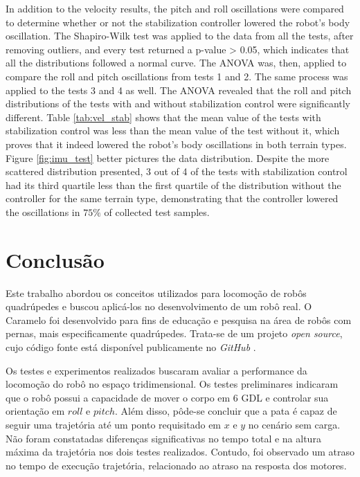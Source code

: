 \documentclass[conference]{IEEEtran}
\begin{document}
In addition to the velocity results, the pitch and roll oscillations were compared to determine whether or not the stabilization controller lowered the robot's body oscillation. The Shapiro-Wilk test was applied to the data from all the tests, after removing outliers, and every test returned a p-value > 0.05, which indicates that all the distributions followed a normal curve. The ANOVA was, then, applied to compare the roll and pitch oscillations from tests 1 and 2. The same process was applied to the tests 3 and 4 as well. The ANOVA revealed that the roll and pitch distributions of the tests with and without stabilization control were significantly different. Table \ref{tab:vel_stab} shows that the mean value of the tests with stabilization control was less than the mean value of the test without it, which proves that it indeed lowered the robot's body oscillations in both terrain types. Figure \ref{fig:imu_test} better pictures the data distribution. Despite the more scattered distribution presented, 3 out of 4 of the tests with stabilization control had its third quartile less than the first quartile of the distribution without the controller for the same terrain type, demonstrating that the controller lowered the oscillations in $75\%$ of collected test samples.


\section{Conclusão}

Este trabalho abordou os conceitos utilizados para locomoção de robôs quadrúpedes e buscou aplicá-los no desenvolvimento de um robô real. O Caramelo foi desenvolvido para fins de educação e pesquisa na área de robôs com pernas, mais especificamente quadrúpedes. Trata-se de um projeto \textit{open source}, cujo código fonte está disponível publicamente no \textit{GitHub} \cite{CaramelRepo}.

Os testes e experimentos realizados buscaram avaliar a performance da locomoção do robô no espaço tridimensional. Os testes preliminares indicaram que o robô possui a capacidade de mover o corpo em 6 GDL e controlar sua orientação em $roll$ e $pitch$. Além disso, pôde-se concluir que a pata é capaz de seguir uma trajetória até um ponto requisitado em $x$ e $y$ no cenário sem carga. Não foram constatadas diferenças significativas no tempo total e na altura máxima da trajetória nos dois testes realizados. Contudo, foi observado um atraso no tempo de execução trajetória, relacionado ao atraso na resposta dos motores.
\end{document}
